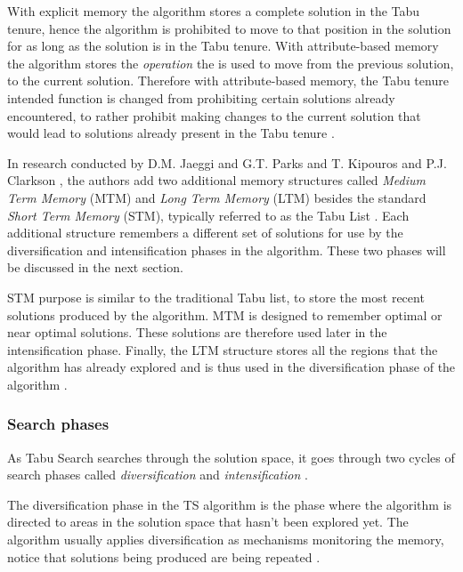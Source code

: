 With explicit memory the algorithm stores a complete solution in the Tabu tenure, hence the algorithm is prohibited to move to that position in the solution for as long as the solution is in the Tabu tenure\cite{TabuBiddingStrats,TabuFormGames}. With attribute-based memory the algorithm stores the \emph{operation} the is used to move from the previous solution, to the current solution\cite{TabuBiddingStrats,TabuFormGames}. Therefore with attribute-based memory, the Tabu tenure intended function is changed from prohibiting certain solutions already encountered, to rather prohibit making changes to the current solution that would lead to solutions already present in the Tabu tenure \cite{TabuBiddingStrats,TabuFormGames}.

In research conducted by D.M. Jaeggi and G.T. Parks and T. Kipouros and P.J. Clarkson \cite{MultiObjTabu}, the authors add two additional memory structures called \emph{Medium Term Memory} (MTM) and \emph{Long Term Memory} (LTM) besides the standard \emph{Short Term Memory} (STM), typically referred to as the Tabu List \cite{MultiObjTabu}. Each additional structure remembers a different set of solutions for use by the diversification and intensification phases in the algorithm. These two phases will be discussed in the next section.

STM purpose is similar to the traditional Tabu list, to store the most recent solutions produced by the algorithm. MTM is designed to remember optimal or near optimal solutions. These solutions are therefore used later in the intensification phase. Finally, the LTM structure stores all the regions that the algorithm has already explored and is thus used in the diversification phase of the algorithm \cite{MultiObjTabu}.

\subsubsection{Search phases}
As Tabu Search searches through the solution space, it goes through two cycles of search phases called \emph{diversification} and \emph{intensification} \cite{TabuParameterization,TabuCrewSchedulingProblem,NonlinearGlobalTabu,SelfControllingReactiveTabu}.

The diversification phase in the TS algorithm is the phase where the algorithm is directed to areas in the solution space that hasn't been explored yet. The algorithm usually applies diversification as mechanisms monitoring the memory, notice that solutions being produced are being repeated \cite{ReactiveTabuVHR,SelfControllingReactiveTabu}. 

